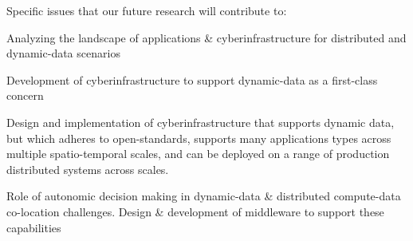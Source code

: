\documentclass[12pt]{article}
\begin{document}
\noindent Specific issues that our future research will contribute to:





\begin{itemize*}\vspace{-0.075in}
\item Analyzing the landscape of applications \&
  cyberinfrastructure %
  for distributed and dynamic-data scenarios

\item Development of cyberinfrastructure to support
  dynamic-data as a first-class concern %

\item Design and implementation of %
  cyberinfrastructure that supports dynamic data, but which adheres
  to open-standards,
  supports many applications types across multiple spatio-temporal scales,
  and can be deployed on a range of production
  distributed systems across scales.
 

\item Role of autonomic decision making in dynamic-data \&
  distributed compute-data co-location challenges. Design \&
  development of middleware to
  support these capabilities 
\end{itemize*}

\end{document}
